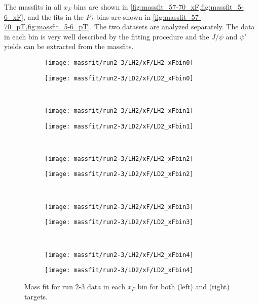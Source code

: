 \documentclass[../main.tex]{subfiles}
\begin{document}
The massfits in all $x_F$ bins are shown in \cref{fig:massfit_57-70_xF,fig:massfit_5-6_xF},
and the fits in the $P_T$ bins are shown in \cref{fig:massfit_57-70_pT,fig:massfit_5-6_pT}.
The two datasets are analyzed separately. The data in each bin is very well described by the fitting procedure
and the $J/\psi$ and $\psi'$ yields can be extracted from the massfits.
\begin{figure}[h]
	\centering
	\begin{subfigure}{0.4\linewidth}
		\texttt{[image: massfit/run2-3/LH2/xF/LH2\_xFbin0]}
	\end{subfigure}
	\begin{subfigure}{0.4\linewidth}
		\texttt{[image: massfit/run2-3/LD2/xF/LD2\_xFbin0]}
	\end{subfigure}\\
	\begin{subfigure}{0.4\linewidth}
		\texttt{[image: massfit/run2-3/LH2/xF/LH2\_xFbin1]}
	\end{subfigure}
	\begin{subfigure}{0.4\linewidth}
		\texttt{[image: massfit/run2-3/LD2/xF/LD2\_xFbin1]}
	\end{subfigure}\\
	\begin{subfigure}{0.4\linewidth}
		\texttt{[image: massfit/run2-3/LH2/xF/LH2\_xFbin2]}
	\end{subfigure}
	\begin{subfigure}{0.4\linewidth}
		\texttt{[image: massfit/run2-3/LD2/xF/LD2\_xFbin2]}
	\end{subfigure}\\
	\begin{subfigure}{0.4\linewidth}
		\texttt{[image: massfit/run2-3/LH2/xF/LH2\_xFbin3]}
	\end{subfigure}
	\begin{subfigure}{0.4\linewidth}
		\texttt{[image: massfit/run2-3/LD2/xF/LD2\_xFbin3]}
	\end{subfigure}\\
	\begin{subfigure}{0.4\linewidth}
		\texttt{[image: massfit/run2-3/LH2/xF/LH2\_xFbin4]}
	\end{subfigure}
	\begin{subfigure}{0.4\linewidth}
		\texttt{[image: massfit/run2-3/LD2/xF/LD2\_xFbin4]}
	\end{subfigure}
	\caption{Mass fit for run 2-3 data in each $x_F$ bin for both (left) and (right) targets. }
	\label{fig:massfit_57-70_xF}
\end{figure}
\end{document}
